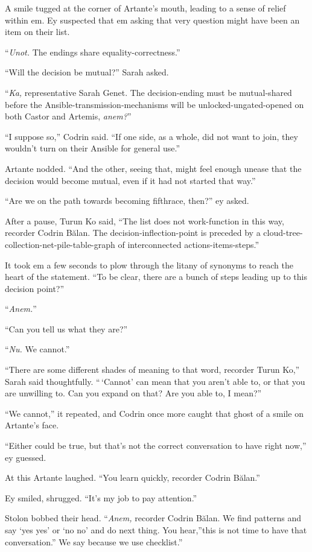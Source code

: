 A smile tugged at the corner of Artante's mouth, leading to a sense of relief within em. Ey suspected that em asking that very question might have been an item on their list.

``\emph{Unot.} The endings share equality-correctness.''

``Will the decision be mutual?'' Sarah asked.

``\emph{Ka,} representative Sarah Genet. The decision-ending must be mutual-shared before the Ansible-transmission-mechanisms will be unlocked-ungated-opened on both Castor and Artemis, \emph{anem?}''

``I suppose so,'' Codrin said. ``If one side, as a whole, did not want to join, they wouldn't turn on their Ansible for general use.''

Artante nodded. ``And the other, seeing that, might feel enough unease that the decision would become mutual, even if it had not started that way.''

``Are we on the path towards becoming fifthrace, then?'' ey asked.

After a pause, Turun Ko said, ``The list does not work-function in this way, recorder Codrin Bălan. The decision-inflection-point is preceded by a cloud-tree-collection-net-pile-table-graph of interconnected actions-items-steps.''

It took em a few seconds to plow through the litany of synonyms to reach the heart of the statement. ``To be clear, there are a bunch of steps leading up to this decision point?''

``\emph{Anem.}''

``Can you tell us what they are?''

``\emph{Nu.} We cannot.''

``There are some different shades of meaning to that word, recorder Turun Ko,'' Sarah said thoughtfully. ``\,`Cannot' can mean that you aren't able to, or that you are unwilling to. Can you expand on that? Are you able to, I mean?''

``We cannot,'' it repeated, and Codrin once more caught that ghost of a smile on Artante's face.

``Either could be true, but that's not the correct conversation to have right now,'' ey guessed.

At this Artante laughed. ``You learn quickly, recorder Codrin Bălan.''

Ey smiled, shrugged. ``It's my job to pay attention.''

Stolon bobbed their head. ``\emph{Anem,} recorder Codrin Bălan. We find patterns and say `yes yes' or `no no' and do next thing. You hear,''this is not time to have that conversation.'' We say because we use checklist.''


